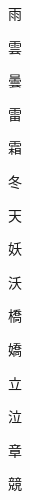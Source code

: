 \begin{spacing}{2.5}
{\Huge \begin{CJK}{UTF8}{min} 雨\end{CJK}}\hspace{0.1cm}
{\Huge \begin{CJK}{UTF8}{min} 雲\end{CJK}}\hspace{0.1cm}
{\Huge \begin{CJK}{UTF8}{min} 曇\end{CJK}}\hspace{0.1cm}
{\Huge \begin{CJK}{UTF8}{min} 雷\end{CJK}}\hspace{0.1cm}
{\Huge \begin{CJK}{UTF8}{min} 霜\end{CJK}}\hspace{0.1cm}
{\Huge \begin{CJK}{UTF8}{min} 冬\end{CJK}}\hspace{0.1cm}
{\Huge \begin{CJK}{UTF8}{min} 天\end{CJK}}\hspace{0.1cm}
{\Huge \begin{CJK}{UTF8}{min} 妖\end{CJK}}\hspace{0.1cm}
{\Huge \begin{CJK}{UTF8}{min} 沃\end{CJK}}\hspace{0.1cm}
{\Huge \begin{CJK}{UTF8}{min} 橋\end{CJK}}\hspace{0.1cm}
{\Huge \begin{CJK}{UTF8}{min} 嬌\end{CJK}}\hspace{0.1cm}
{\Huge \begin{CJK}{UTF8}{min} 立\end{CJK}}\hspace{0.1cm}
{\Huge \begin{CJK}{UTF8}{min} 泣\end{CJK}}\hspace{0.1cm}
{\Huge \begin{CJK}{UTF8}{min} 章\end{CJK}}\hspace{0.1cm}
{\Huge \begin{CJK}{UTF8}{min} 競\end{CJK}}\hspace{0.1cm}

\end{spacing}
